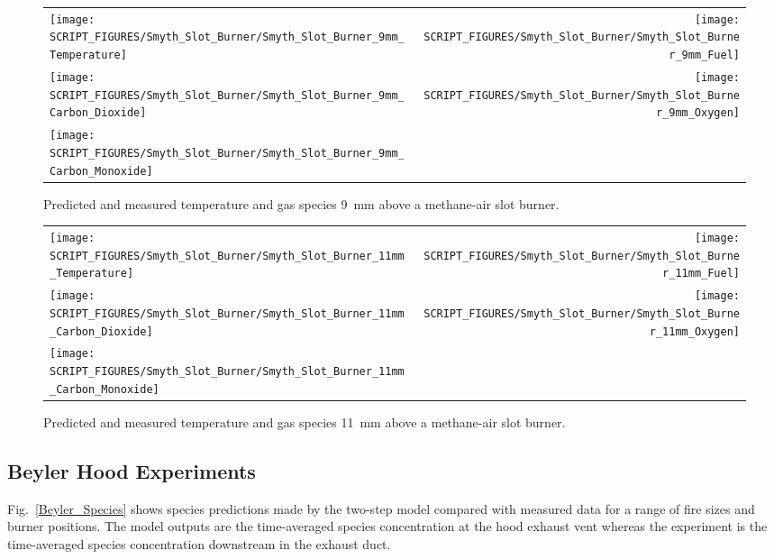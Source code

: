 \begin{figure}[p]
\begin{tabular*}{\textwidth}{l@{\extracolsep{\fill}}r}
\texttt{[image: SCRIPT\_FIGURES/Smyth\_Slot\_Burner/Smyth\_Slot\_Burner\_9mm\_Temperature]} &
\texttt{[image: SCRIPT\_FIGURES/Smyth\_Slot\_Burner/Smyth\_Slot\_Burner\_9mm\_Fuel]} \\
\texttt{[image: SCRIPT\_FIGURES/Smyth\_Slot\_Burner/Smyth\_Slot\_Burner\_9mm\_Carbon\_Dioxide]} &
\texttt{[image: SCRIPT\_FIGURES/Smyth\_Slot\_Burner/Smyth\_Slot\_Burner\_9mm\_Oxygen]} \\
\texttt{[image: SCRIPT\_FIGURES/Smyth\_Slot\_Burner/Smyth\_Slot\_Burner\_9mm\_Carbon\_Monoxide]} &
\end{tabular*}
\caption[Temperature and gas species predictions 9~mm above burner, Smyth experiment]
{Predicted and measured temperature and gas species 9~mm above a methane-air slot burner.}
\label{Smyth_Slot_Burner_9}
\end{figure}

\begin{figure}[p]
\begin{tabular*}{\textwidth}{l@{\extracolsep{\fill}}r}
\texttt{[image: SCRIPT\_FIGURES/Smyth\_Slot\_Burner/Smyth\_Slot\_Burner\_11mm\_Temperature]} &
\texttt{[image: SCRIPT\_FIGURES/Smyth\_Slot\_Burner/Smyth\_Slot\_Burner\_11mm\_Fuel]} \\
\texttt{[image: SCRIPT\_FIGURES/Smyth\_Slot\_Burner/Smyth\_Slot\_Burner\_11mm\_Carbon\_Dioxide]} &
\texttt{[image: SCRIPT\_FIGURES/Smyth\_Slot\_Burner/Smyth\_Slot\_Burner\_11mm\_Oxygen]} \\
\texttt{[image: SCRIPT\_FIGURES/Smyth\_Slot\_Burner/Smyth\_Slot\_Burner\_11mm\_Carbon\_Monoxide]} &
\end{tabular*}
\caption[Temperature and gas species predictions 11~mm above burner, Smyth experiment]
{Predicted and measured temperature and gas species 11~mm above a methane-air slot burner.}
\label{Smyth_Slot_Burner_11}
\end{figure}

\clearpage

\subsection{Beyler Hood Experiments}

Fig.~\ref{Beyler_Species} shows species predictions made by the two-step model compared with measured data for a range of fire sizes and burner positions.  The model outputs are the time-averaged species concentration at the hood exhaust vent whereas the experiment is the time-averaged species concentration downstream in the exhaust duct.

